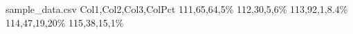 



\begin{filecontents*}{sample_data.csv}
    Col1,Col2,Col3,ColPct
    111,65,64,5\%
    112,30,5,6\%
    113,92,1,8.4\%
    114,47,19,20\%
    115,38,15,1\%
\end{filecontents*}

\documentclass{article}
\usepackage{csvsimple,longtable,booktabs}


    {\ColOne & \ColTwo & \ColThree & \Percentage}

    \csvreader[
    
    ]{}{}{}






